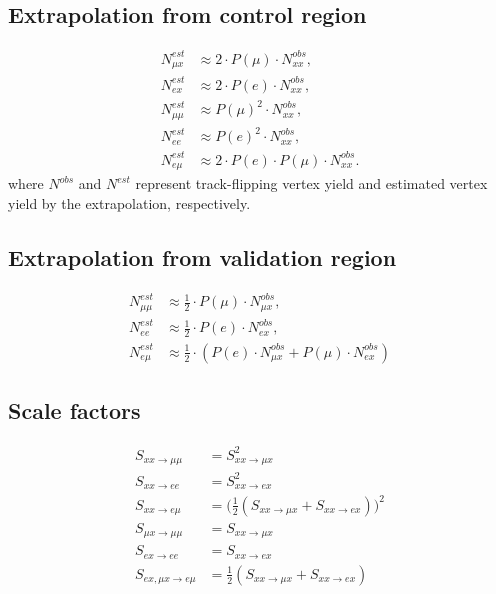 \subsection{Extrapolation from control region}
\begin{align}
\label{eq:TF_extrapolation_from_control}
N_{\mu x}^{est} &\approx 2 \cdot P(\mu) \cdot N_{xx}^{obs},\nonumber\\
N_{e x}^{est}   &\approx 2 \cdot P(e) \cdot N_{xx}^{obs}, \nonumber \\
N_{\mu\mu}^{est}&\approx P(\mu)^{2} \cdot N_{xx}^{obs}, \nonumber \\
N_{ee}^{est}    &\approx P(e)^{2} \cdot N_{xx}^{obs}, \nonumber \\
N_{e \mu}^{est} &\approx 2\cdot P(e)\cdot P(\mu) \cdot N_{xx}^{obs}.
\end{align}
where $N^{obs}$ and $N^{est}$ represent track-flipping vertex yield and estimated vertex yield by the extrapolation, respectively.

\subsection{Extrapolation from validation region}
\begin{align}
\label{eq:TF_extrapolation_from_validation}
N_{\mu\mu}^{est}&\approx \frac{1}{2} \cdot P(\mu) \cdot N_{\mu x}^{obs}, \nonumber \\
N_{ee}^{est}    &\approx \frac{1}{2} \cdot P(e) \cdot N_{e x}^{obs}, \nonumber \\
N_{e \mu}^{est} &\approx \frac{1}{2} \cdot (P(e) \cdot N_{\mu x}^{obs} + P(\mu) \cdot N_{ex}^{obs})
\end{align}

\subsection{Scale factors}
\begin{align}
\label{eq:TF_scale_factors}
S_{xx \rightarrow \mu\mu} &=  S_{xx \rightarrow \mu x}^{2}  \nonumber\\
S_{xx \rightarrow ee} &= S_{xx \rightarrow ex}^{2}  \nonumber\\
S_{xx \rightarrow e\mu} &= \Big(\frac{1}{2} (S_{xx \rightarrow \mu x} + S_{xx \rightarrow ex})\Big)^{2} \nonumber\\
S_{\mu x \rightarrow \mu\mu} &=  S_{xx \rightarrow \mu x}  \nonumber\\
S_{e x \rightarrow ee} &= S_{xx \rightarrow ex}  \nonumber\\
S_{e x, \mu x \rightarrow e\mu} &= \frac{1}{2} (S_{xx \rightarrow \mu x} + S_{xx \rightarrow ex})
\end{align}




